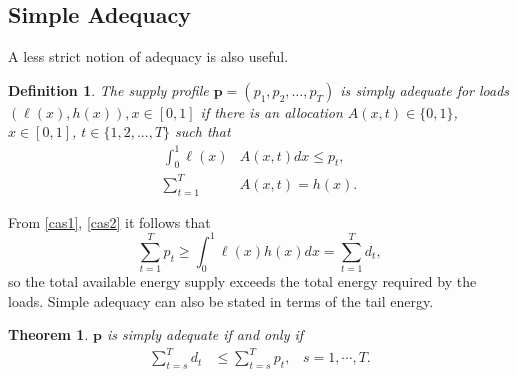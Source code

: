 \documentclass[10pt,draftcls,onecolumn]{IEEEtran}
\newtheorem{theorem}{Theorem}
\newtheorem{definition}{Definition}
\let \VEC \mathbf
\newcounter{l1}
\newcounter{l2}
\newcounter{l3}
\begin{document}
\subsection{Simple Adequacy}
A  less strict notion of adequacy is also useful.
\begin{definition}
The supply profile $\VEC p=(p_1,p_2,\ldots,p_T)$ is  \emph{simply adequate}  for loads $(\ell(x),h(x)), x \in [0,1]$ if there is an allocation  $A(x,t) \in \{0,1\}$, $x \in [0,1]$, $t \in \{1,2,...,T\}$  such that
\begin{align}
\int_0^1 \ell(x)&A(x,t)dx \leq p_t ,\label{cas1}\\
\sum_{t=1}^T &A(x,t) = h(x) .\label{cas2}
\end{align}
\end{definition}
From \eqref{cas1}, \eqref{cas2} it follows that
\begin{equation}
\sum_{t=1}^T p_t    \geq  \int_0^1 \ell(x)h(x)dx = \sum_{t=1}^T d_t,
\end{equation}
so the total available energy supply  exceeds the total  energy required by the loads.
Simple adequacy can also be stated in terms of  the tail energy.
\begin{theorem} \label{thm2}
 $\VEC p$ is simply adequate if and only if
  \begin{align}
\sum_{t=s}^T d_t &\leq \sum_{t=s}^T p_t,\;\;\;s=1, \cdots ,T. \label{sa}
\end{align}
\end{theorem}
\end{document}
